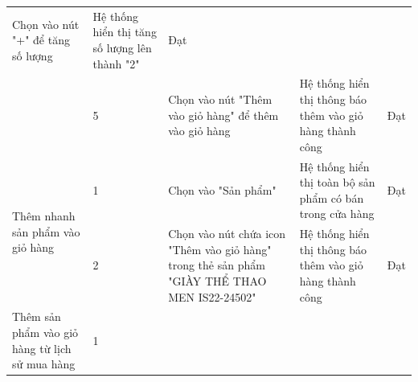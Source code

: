 {\begin{longtable}{| p{2.5cm}| p{1cm}| p{5.5cm}| p{4.5cm} | p{1.5cm} |}
        Chọn vào nút "+" để tăng số lượng                                                            &
        Hệ thống hiển thị tăng số lượng lên thành "2"                                                &
        Đạt                                                                                                                                                                                         \\
        \cline{2-5}
                                                                                                     & 5                  &
        Chọn vào nút "Thêm vào giỏ hàng" để thêm vào giỏ hàng                                        &
        Hệ thống hiển thị thông báo thêm vào giỏ hàng thành công                                     &
        Đạt                                                                                                                                                                                         \\
        \hline
        \multirow[t]{2}{2.5cm}{Thêm nhanh sản phẩm vào giỏ hàng}                                     &
        1                                                                                            &
        Chọn vào "Sản phẩm"                                                                          &
        Hệ thống hiển thị toàn bộ sản phẩm có bán trong cửa hàng                                     &
        Đạt                                                                                                                                                                                         \\
        \cline{2-5}
                                                                                                     & 2                  &
        Chọn vào nút chứa icon "Thêm vào giỏ hàng" trong thẻ sản phẩm "GIÀY THỂ THAO MEN IS22-24502" &
        Hệ thống hiển thị thông báo thêm vào giỏ hàng thành công                                     &
        Đạt                                                                                                                                                                                         \\
        \hline
        \multirow[t]{2}{2.5cm}{Thêm sản phẩm vào giỏ hàng từ lịch sử mua hàng}                       &
        1                                                                                            &

\end{longtable}}
